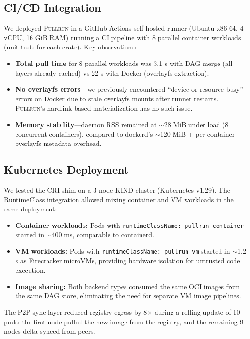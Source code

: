 \documentclass[11pt,a4paper]{article}
\newcommand{\pullrun}{\textsc{Pullrun}}
\begin{document}
\subsection{CI/CD Integration}

We deployed \pullrun{} in a GitHub Actions self-hosted runner (Ubuntu x86-64, 4 vCPU, 16 GiB RAM) running a CI pipeline with 8 parallel container workloads (unit tests for each crate). Key observations:

\begin{itemize}[leftmargin=*]
    \item \textbf{Total pull time} for 8 parallel workloads was 3.1 s with DAG merge (all layers already cached) vs 22 s with Docker (overlayfs extraction).
    \item \textbf{No overlayfs errors}---we previously encountered ``device or resource busy'' errors on Docker due to stale overlayfs mounts after runner restarts. \pullrun{}'s hardlink-based materialization has no such issue.
    \item \textbf{Memory stability}---daemon RSS remained at $\sim$28 MiB under load (8 concurrent containers), compared to dockerd's $\sim$120 MiB + per-container overlayfs metadata overhead.
\end{itemize}

\subsection{Kubernetes Deployment}

We tested the CRI shim on a 3-node KIND cluster (Kubernetes v1.29). The RuntimeClass integration allowed mixing container and VM workloads in the same deployment:

\begin{itemize}[leftmargin=*]
    \item \textbf{Container workloads:} Pods with \texttt{runtimeClassName: pullrun-container} started in $\sim$400 ms, comparable to containerd.
    \item \textbf{VM workloads:} Pods with \texttt{runtimeClassName: pullrun-vm} started in $\sim$1.2 s as Firecracker microVMs, providing hardware isolation for untrusted code execution.
    \item \textbf{Image sharing:} Both backend types consumed the same OCI images from the same DAG store, eliminating the need for separate VM image pipelines.
\end{itemize}

The P2P sync layer reduced registry egress by 8$\times$ during a rolling update of 10 pods: the first node pulled the new image from the registry, and the remaining 9 nodes delta-synced from peers.
\end{document}
